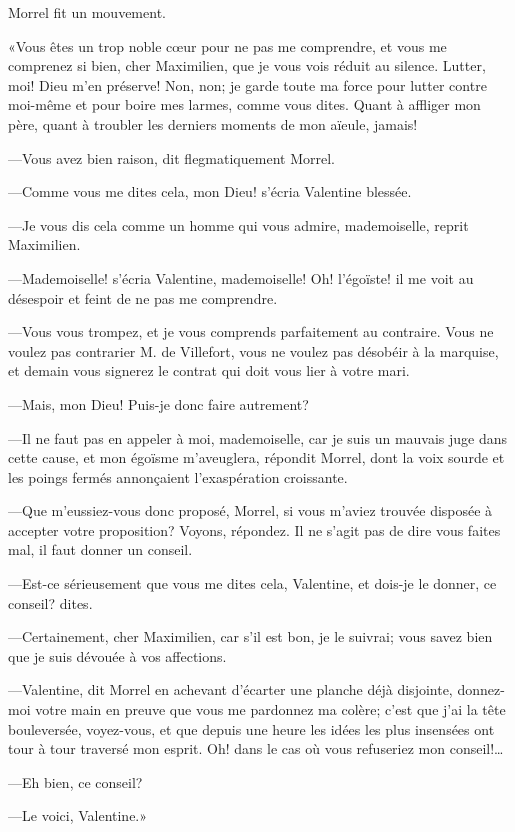 Morrel fit un mouvement. 

«Vous êtes un trop noble cœur pour ne pas me comprendre, et vous me comprenez si bien, cher Maximilien, que je vous vois réduit au silence. Lutter, moi! Dieu m'en préserve! Non, non; je garde toute ma force pour lutter contre moi-même et pour boire mes larmes, comme vous dites. Quant à affliger mon père, quant à troubler les derniers moments de mon aïeule, jamais! 

—Vous avez bien raison, dit flegmatiquement Morrel. 

—Comme vous me dites cela, mon Dieu! s'écria Valentine blessée. 

—Je vous dis cela comme un homme qui vous admire, mademoiselle, reprit Maximilien. 

—Mademoiselle! s'écria Valentine, mademoiselle! Oh! l'égoïste! il me voit au désespoir et feint de ne pas me comprendre. 

—Vous vous trompez, et je vous comprends parfaitement au contraire. Vous ne voulez pas contrarier M. de Villefort, vous ne voulez pas désobéir à la marquise, et demain vous signerez le contrat qui doit vous lier à votre mari.  

—Mais, mon Dieu! Puis-je donc faire autrement? 

—Il ne faut pas en appeler à moi, mademoiselle, car je suis un mauvais juge dans cette cause, et mon égoïsme m'aveuglera, répondit Morrel, dont la voix sourde et les poings fermés annonçaient l'exaspération croissante. 

—Que m'eussiez-vous donc proposé, Morrel, si vous m'aviez trouvée disposée à accepter votre proposition? Voyons, répondez. Il ne s'agit pas de dire vous faites mal, il faut donner un conseil. 

—Est-ce sérieusement que vous me dites cela, Valentine, et dois-je le donner, ce conseil? dites. 

—Certainement, cher Maximilien, car s'il est bon, je le suivrai; vous savez bien que je suis dévouée à vos affections. 

—Valentine, dit Morrel en achevant d'écarter une planche déjà disjointe, donnez-moi votre main en preuve que vous me pardonnez ma colère; c'est que j'ai la tête bouleversée, voyez-vous, et que depuis une heure les idées les plus insensées ont tour à tour traversé mon esprit. Oh! dans le cas où vous refuseriez mon conseil!\dots 

—Eh bien, ce conseil? 

—Le voici, Valentine.» 

